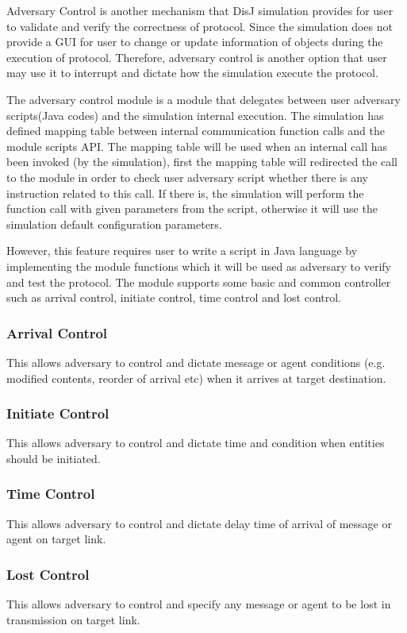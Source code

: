 Adversary Control is another mechanism that DisJ simulation provides for user to validate and verify the correctness of protocol. Since the simulation does not provide a GUI for user to change or update information of objects during the execution of protocol. Therefore, adversary control is another option that user may use it to interrupt and dictate how the simulation execute the protocol.

The adversary control module is a module that delegates between user adversary scripts(Java codes) and the simulation internal execution. The simulation has defined mapping table between internal communication function calls and the module scripts API. The mapping table will be used when an internal call has been invoked (by the simulation), first the mapping table will redirected the call to the module in order to check user adversary script whether there is any instruction related to this call. If there is, the simulation will perform the function call with given parameters from the script, otherwise it will use the simulation default configuration parameters.

However, this feature requires user to write a script in Java language by implementing the module functions which it will be used as adversary to verify and test the protocol. The module supports some basic and common controller such as arrival control, initiate control, time control and lost control.

\subsubsection*{Arrival Control}
This allows adversary to control and dictate message or agent conditions (e.g. modified contents, reorder of arrival etc) when it arrives at target destination.

\subsubsection*{Initiate Control}
This allows adversary to control and dictate time and condition when entities should be initiated.

\subsubsection*{Time Control}
This allows adversary to control and dictate delay time of arrival of message or agent on target link.

\subsubsection*{Lost Control}
This allows adversary to control and specify any message or agent to be lost in transmission on target link.


